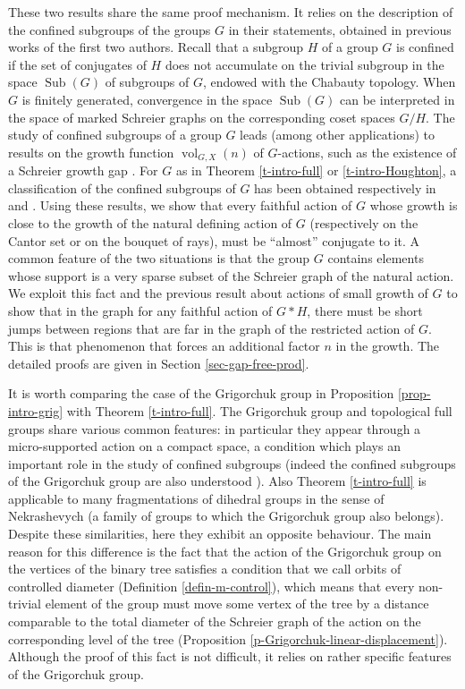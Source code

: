 \documentclass[11pt]{amsart}
\newcommand{\vol}{\ensuremath{\operatorname{vol}}}%
\newcommand{\sub}{\ensuremath{\operatorname{Sub}}}%
\theoremstyle{definition}
\theoremstyle{plain}
\theoremstyle{remark}
\begin{document}
These two results share the same proof mechanism. It relies on the description of the confined subgroups of the groups $G$ in their statements, obtained in previous works of the first two authors. Recall that a subgroup $H$ of a group $G$ is confined if the set of conjugates of $H$ does not accumulate on the trivial subgroup in the space $\sub(G)$ of subgroups of $G$, endowed with the Chabauty topology. When $G$ is finitely generated, convergence in the space $\sub(G)$ can be interpreted in the space of marked Schreier graphs on the corresponding coset spaces $G/H$. The study of confined subgroups of a group $G$ leads (among other applications) to results on the growth function $\vol_{G, X}(n)$ of  $G$-actions, such as the existence of a Schreier growth gap \cite{MB-full,LB-MB-comm-lemma,LB-MB-solv}. For $G$ as in Theorem \ref{t-intro-full} or \ref{t-intro-Houghton}, a classification of the confined subgroups of $G$ has been obtained respectively in  \cite{MB-full} and \cite{LB-MB-solv}. Using these results, we show that every faithful action of $G$ whose growth is close to the growth of the natural defining action of $G$ (respectively on the Cantor set or on the bouquet of rays), must be ``almost'' conjugate to it. A common feature of the two situations is that the group $G$ contains elements whose support is a very sparse subset of  the Schreier graph of the natural action. We exploit this fact and the previous result about actions of small growth of $G$ to show that in the graph for any faithful action of $G\ast H$, there must be short jumps between regions that are far in the graph of the restricted action of $G$. This is that phenomenon that forces an additional factor $n$ in the growth. The detailed proofs are given in Section \ref{sec-gap-free-prod}.


It is worth comparing the case of the Grigorchuk group in Proposition \ref{prop-intro-grig} with Theorem \ref{t-intro-full}. The Grigorchuk group and topological full groups share various common features: in particular they appear through a micro-supported action on a compact space, a condition which plays an important role in the study of confined subgroups (indeed the confined subgroups of the Grigorchuk group are also understood \cite{LB-MB-comm-lemma}). Also Theorem \ref{t-intro-full} is applicable to many fragmentations of dihedral groups in the sense of Nekrashevych \cite{Nek-frag} (a family of groups to which the Grigorchuk group also belongs). Despite these similarities, here they exhibit an opposite behaviour. The main reason for this difference is the fact that the action of the Grigorchuk group on the vertices of the binary tree satisfies a condition that we call orbits of controlled diameter (Definition \ref{defin-m-control}), which means that every non-trivial element of the group must move some vertex of the tree by a distance comparable to the total diameter of the Schreier graph of the action on the corresponding level of the tree (Proposition \ref{p-Grigorchuk-linear-displacement}). Although the proof of this fact is not difficult, it relies on rather specific features of the Grigorchuk group. 
\end{document}
